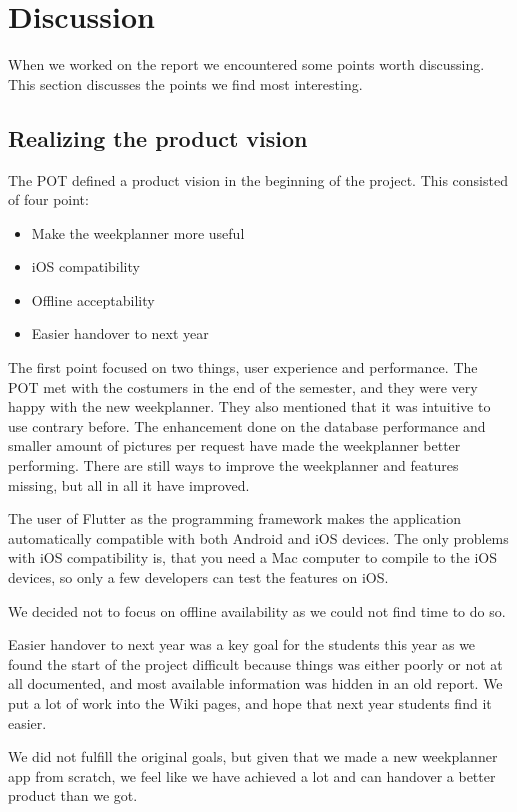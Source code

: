 \section{Discussion}

When we worked on the report we encountered some points worth discussing. This section discusses the points we find most interesting. 

\subsection{Realizing the product vision}
The \gls{POT} defined a product vision in the beginning of the project. This consisted of four point:
\begin{itemize}
    \item Make the weekplanner more useful
    \item iOS compatibility
    \item Offline acceptability
    \item Easier handover to next year
\end{itemize}
The first point focused on two things, user experience and performance. The \gls{POT} met with the costumers in the end of the semester, and they were very happy with the new weekplanner. They also mentioned that it was intuitive to use contrary before. The enhancement done on the database performance and smaller amount of pictures per request have made the weekplanner better performing. There are still ways to improve the weekplanner and features missing, but all in all it have improved.

The user of Flutter as the programming framework makes the application automatically compatible with both Android and iOS devices. The only problems with iOS compatibility is, that you need a Mac computer to compile to the iOS devices, so only a few developers can test the features on iOS. 

We decided not to focus on offline availability as we could not find time to do so.

Easier handover to next year was a key goal for the students this year as we found the start of the project difficult because things was either poorly or not at all documented, and most available information was hidden in an old report. We put a lot of work into the Wiki pages, and hope that next year students find it easier.

We did not fulfill the original goals, but given that we made a new weekplanner app from scratch, we feel like we have achieved a lot and can handover a better product than we got.

